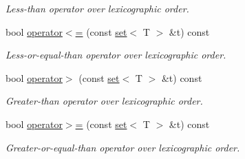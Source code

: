 \begin{DoxyCompactItemize}
\begin{DoxyCompactList}\small\item\em Less-\/than operator over lexicographic order. \end{DoxyCompactList}\item 
\hypertarget{classmerlin_1_1set_acd79b5291a0c3eff64f993cf25031418}{}bool \hyperlink{classmerlin_1_1set_acd79b5291a0c3eff64f993cf25031418}{operator$<$=} (const \hyperlink{classmerlin_1_1set}{set}$<$ T $>$ \&t) const \label{classmerlin_1_1set_acd79b5291a0c3eff64f993cf25031418}

\begin{DoxyCompactList}\small\item\em Less-\/or-\/equal-\/than operator over lexicographic order. \end{DoxyCompactList}\item 
\hypertarget{classmerlin_1_1set_a8fc807637ddc148480a9d155b2f6998f}{}bool \hyperlink{classmerlin_1_1set_a8fc807637ddc148480a9d155b2f6998f}{operator$>$} (const \hyperlink{classmerlin_1_1set}{set}$<$ T $>$ \&t) const \label{classmerlin_1_1set_a8fc807637ddc148480a9d155b2f6998f}

\begin{DoxyCompactList}\small\item\em Greater-\/than operator over lexicographic order. \end{DoxyCompactList}\item 
\hypertarget{classmerlin_1_1set_a27f64ae1e7ad2e08df34a5dbed0a4d26}{}bool \hyperlink{classmerlin_1_1set_a27f64ae1e7ad2e08df34a5dbed0a4d26}{operator$>$=} (const \hyperlink{classmerlin_1_1set}{set}$<$ T $>$ \&t) const \label{classmerlin_1_1set_a27f64ae1e7ad2e08df34a5dbed0a4d26}

\begin{DoxyCompactList}\small\item\em Greater-\/or-\/equal-\/than operator over lexicographic order. \end{DoxyCompactList}\end{DoxyCompactItemize}

